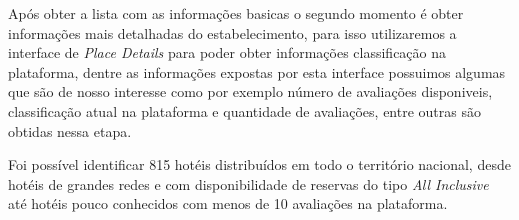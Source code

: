 

Após obter a lista com as informações basicas o segundo momento é obter informações mais detalhadas do estabelecimento, para isso utilizaremos a interface de \emph{Place Details} para poder obter informações classificação na plataforma, dentre as informações expostas por esta interface possuimos algumas que são de nosso interesse como por exemplo número de avaliações disponiveis, classificação atual na plataforma e quantidade de avaliações, entre outras são obtidas nessa etapa.



Foi possível identificar 815 hotéis distribuídos em todo o território nacional, desde hotéis de grandes redes e com disponibilidade de reservas do tipo \emph{All Inclusive} até hotéis pouco conhecidos com menos de 10 avaliações na plataforma.







